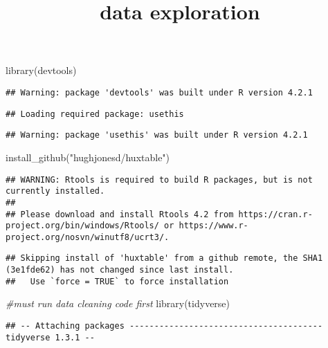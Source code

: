 \documentclass[
]{article}
\title{data exploration}
\author{}
\date{\vspace{-2.5em}}
\newenvironment{Shaded}{\begin{snugshade}}{\end{snugshade}}
\newcommand{\CommentTok}[1]{\textcolor[rgb]{0.56,0.35,0.01}{\textit{#1}}}
\newcommand{\FunctionTok}[1]{\textcolor[rgb]{0.00,0.00,0.00}{#1}}
\newcommand{\NormalTok}[1]{#1}
\newcommand{\StringTok}[1]{\textcolor[rgb]{0.31,0.60,0.02}{#1}}
\begin{document}
\maketitle

\begin{Shaded}
\begin{Highlighting}[]
\FunctionTok{library}\NormalTok{(devtools)}
\end{Highlighting}
\end{Shaded}

\begin{verbatim}
## Warning: package 'devtools' was built under R version 4.2.1
\end{verbatim}

\begin{verbatim}
## Loading required package: usethis
\end{verbatim}

\begin{verbatim}
## Warning: package 'usethis' was built under R version 4.2.1
\end{verbatim}

\begin{Shaded}
\begin{Highlighting}[]
\FunctionTok{install\_github}\NormalTok{(}\StringTok{"hughjonesd/huxtable"}\NormalTok{)}
\end{Highlighting}
\end{Shaded}

\begin{verbatim}
## WARNING: Rtools is required to build R packages, but is not currently installed.
## 
## Please download and install Rtools 4.2 from https://cran.r-project.org/bin/windows/Rtools/ or https://www.r-project.org/nosvn/winutf8/ucrt3/.
\end{verbatim}

\begin{verbatim}
## Skipping install of 'huxtable' from a github remote, the SHA1 (3e1fde62) has not changed since last install.
##   Use `force = TRUE` to force installation
\end{verbatim}

\begin{Shaded}
\begin{Highlighting}[]
\CommentTok{\#must run data cleaning code first}
\FunctionTok{library}\NormalTok{(tidyverse)}
\end{Highlighting}
\end{Shaded}

\begin{verbatim}
## -- Attaching packages --------------------------------------- tidyverse 1.3.1 --
\end{verbatim}
\end{document}
